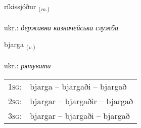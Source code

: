 \documentclass[frontgrid, backgrid]{flacards}\usepackage[]{graphicx}\usepackage[]{xcolor}
\begin{document}
\renewcommand{\flhead}{\vskip5pt \fboxsep=0pt {\small\bfseries\footnotesize Nafnorð | іменник}}
\renewcommand{\fcfoot}{\vskip5pt \fboxsep=0pt \hspace{2pt}{\small\bfseries\footnotesize 2K}}

\renewcommand{\blhead}{\vskip5pt {\small\bfseries\footnotesize Nafnorð | іменник }}
\renewcommand{\bcfoot}{\vskip5pt \hspace{2pt}{\small\bfseries\footnotesize 2K}}


{ríkissjóður \small{\textsubscript{(\textit{m.})}} \\[1ex] %
\textphonetic{[riːcɪsjouðʏr]} \\
ukr.: \emph{державна казначейська служба} \\  [2ex]
\renewcommand*{\arraystretch}{0.8}
}

\renewcommand{\flhead}{\vskip5pt \fboxsep=0pt {\small\bfseries\footnotesize Sagnorð | дієслово}}
\renewcommand{\fcfoot}{\vskip5pt \fboxsep=0pt \hspace{2pt}{\small\bfseries\footnotesize 2K}}

\renewcommand{\blhead}{\vskip5pt {\small\bfseries\footnotesize Sagnorð | дієслово }}
\renewcommand{\bcfoot}{\vskip5pt \hspace{2pt}{\small\bfseries\footnotesize 2K}}


{bjarga \small{\textsubscript{(\textit{v.})}} \\[1ex] %
\textphonetic{[pjarka]} \\
ukr.: \emph{рятувати} \\  [2ex]
\renewcommand*{\arraystretch}{0.8}
\begin{tabular}{p{1cm}l}
\textsc{1sg}: & bjarga -- bjargaði -- bjargað \\ 
\textsc{2sg}: & bjargar -- bjargaðir -- bjargað \\ 
\textsc{3sg}: & bjargar -- bjargaði -- bjargað \\ 
\end{tabular}
}
\end{document}
